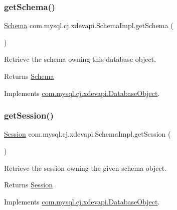 \subsubsection{\texorpdfstring{get\+Schema()}{getSchema()}}
{\footnotesize\ttfamily \mbox{\hyperlink{interfacecom_1_1mysql_1_1cj_1_1xdevapi_1_1_schema}{Schema}} com.\+mysql.\+cj.\+xdevapi.\+Schema\+Impl.\+get\+Schema (\begin{DoxyParamCaption}{ }\end{DoxyParamCaption})}

Retrieve the schema owning this database object.

\begin{DoxyReturn}{Returns}
\mbox{\hyperlink{interfacecom_1_1mysql_1_1cj_1_1xdevapi_1_1_schema}{Schema}} 
\end{DoxyReturn}


Implements \mbox{\hyperlink{interfacecom_1_1mysql_1_1cj_1_1xdevapi_1_1_database_object_a2d3d1b87950c42ecbe557248c51c954b}{com.\+mysql.\+cj.\+xdevapi.\+Database\+Object}}.

\mbox{\label{classcom_1_1mysql_1_1cj_1_1xdevapi_1_1_schema_impl_ab09abc096390ec7f763d045636551b7f}} 
\subsubsection{\texorpdfstring{get\+Session()}{getSession()}}
{\footnotesize\ttfamily \mbox{\hyperlink{interfacecom_1_1mysql_1_1cj_1_1xdevapi_1_1_session}{Session}} com.\+mysql.\+cj.\+xdevapi.\+Schema\+Impl.\+get\+Session (\begin{DoxyParamCaption}{ }\end{DoxyParamCaption})}

Retrieve the session owning the given schema object.

\begin{DoxyReturn}{Returns}
\mbox{\hyperlink{interfacecom_1_1mysql_1_1cj_1_1xdevapi_1_1_session}{Session}} 
\end{DoxyReturn}


Implements \mbox{\hyperlink{interfacecom_1_1mysql_1_1cj_1_1xdevapi_1_1_database_object_a0bebc7132108a9cfcffed4a599b2dad5}{com.\+mysql.\+cj.\+xdevapi.\+Database\+Object}}.

